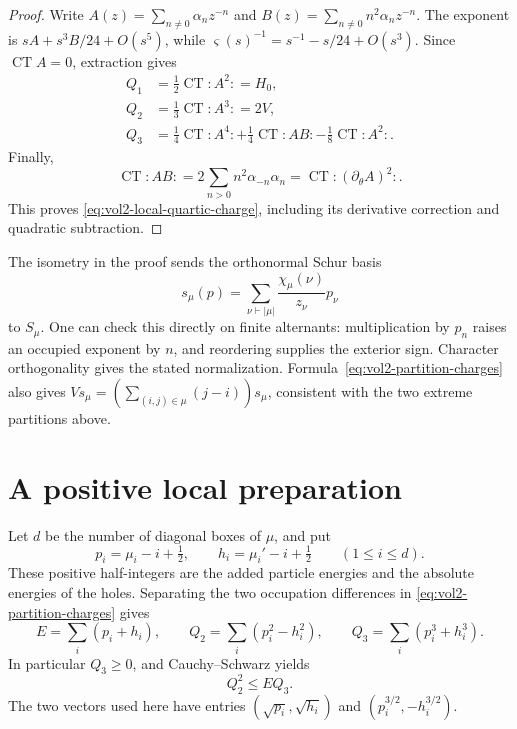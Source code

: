 \begin{proof}
Write \(A(z)=\sum_{n\ne0}\alpha_nz^{-n}\) and
\(B(z)=\sum_{n\ne0}n^2\alpha_nz^{-n}\). The exponent is
\(sA+s^3B/24+O(s^5)\), while
\(\varsigma(s)^{-1}=s^{-1}-s/24+O(s^3)\).
Since \(\operatorname{CT}A=0\), extraction gives
\begin{align*}
 Q_1&=\tfrac12\operatorname{CT}{:}A^2{:}=H_0,\\
 Q_2&=\tfrac13\operatorname{CT}{:}A^3{:}=2V,\\
 Q_3&=\tfrac14\operatorname{CT}{:}A^4{:}
      +\tfrac14\operatorname{CT}{:}AB{:}
      -\tfrac18\operatorname{CT}{:}A^2{:}.
\end{align*}
Finally,
\[
 \operatorname{CT}{:}AB{:}
 =2\sum_{n>0}n^2\alpha_{-n}\alpha_n
 =\operatorname{CT}{:}(\partial_\theta A)^2{:}.
\]
This proves \eqref{eq:vol2-local-quartic-charge}, including its
derivative correction and quadratic subtraction.
\end{proof}

The isometry in the proof sends the orthonormal Schur basis
\[
 s_\mu(p)=\sum_{\nu\vdash |\mu|}
                  \frac{\chi_\mu(\nu)}{z_\nu}p_\nu
\]
to \(S_\mu\). One can check this directly on finite alternants:
multiplication by \(p_n\) raises an occupied exponent by \(n\),
and reordering supplies the exterior sign. Character orthogonality
gives the stated normalization. Formula~\eqref{eq:vol2-partition-charges}
also gives \(V s_\mu=(\sum_{(i,j)\in\mu}(j-i))s_\mu\),
consistent with the two extreme partitions above.

\section{A positive local preparation}

Let \(d\) be the number of diagonal boxes of \(\mu\), and put
\[
 p_i=\mu_i-i+\tfrac12,\qquad
 h_i=\mu_i'-i+\tfrac12\qquad(1\leq i\leq d).
\]
These positive half-integers are the added particle energies and
the absolute energies of the holes. Separating the two occupation
differences in \eqref{eq:vol2-partition-charges} gives
\begin{equation}\label{eq:vol2-particle-hole-charges}
 E=\sum_i(p_i+h_i),\qquad
 Q_2=\sum_i(p_i^2-h_i^2),\qquad
 Q_3=\sum_i(p_i^3+h_i^3).
\end{equation}
In particular \(Q_3\geq0\), and Cauchy--Schwarz yields
\begin{equation}\label{eq:vol2-charge-inequality}
 Q_2^2\leq E Q_3.
\end{equation}
The two vectors used here have entries
\((\sqrt{p_i},\sqrt{h_i})\) and
\((p_i^{3/2},-h_i^{3/2})\).

